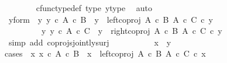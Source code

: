 \begin{isabellebody}
\ \ \ \ \ \ \isamarkupfalse%
\ cfunc{\isacharunderscore}{\kern0pt}type{\isacharunderscore}{\kern0pt}def\ {\isasymphi}{\isacharunderscore}{\kern0pt}type\ y{\isacharunderscore}{\kern0pt}type\ \isamarkupfalse%
\ auto\isanewline
\ \ \ \ \isamarkupfalse%
\ \isamarkupfalse%
\ y{\isacharunderscore}{\kern0pt}form{\isacharcolon}{\kern0pt}\ {\isachardoublequoteopen}{\isacharparenleft}{\kern0pt}{\isasymexists}\ y{\isacharprime}{\kern0pt}{\isachardot}{\kern0pt}\ y{\isacharprime}{\kern0pt}\ {\isasymin}\isactrlsub c\ A\ {\isasymtimes}\isactrlsub c\ B\ {\isasymand}\ y\ {\isacharequal}{\kern0pt}\ {\isacharparenleft}{\kern0pt}left{\isacharunderscore}{\kern0pt}coproj\ {\isacharparenleft}{\kern0pt}A\ {\isasymtimes}\isactrlsub c\ B{\isacharparenright}{\kern0pt}\ {\isacharparenleft}{\kern0pt}A\ {\isasymtimes}\isactrlsub c\ C{\isacharparenright}{\kern0pt}{\isacharparenright}{\kern0pt}\ {\isasymcirc}\isactrlsub c\ y{\isacharprime}{\kern0pt}{\isacharparenright}{\kern0pt}\isanewline
\ \ \ \ \ \ {\isasymor}\ \ {\isacharparenleft}{\kern0pt}{\isasymexists}\ y{\isacharprime}{\kern0pt}{\isachardot}{\kern0pt}\ y{\isacharprime}{\kern0pt}\ {\isasymin}\isactrlsub c\ A\ {\isasymtimes}\isactrlsub c\ C\ {\isasymand}\ y\ {\isacharequal}{\kern0pt}\ {\isacharparenleft}{\kern0pt}right{\isacharunderscore}{\kern0pt}coproj\ {\isacharparenleft}{\kern0pt}A\ {\isasymtimes}\isactrlsub c\ B{\isacharparenright}{\kern0pt}\ {\isacharparenleft}{\kern0pt}A\ {\isasymtimes}\isactrlsub c\ C{\isacharparenright}{\kern0pt}{\isacharparenright}{\kern0pt}\ {\isasymcirc}\isactrlsub c\ y{\isacharprime}{\kern0pt}{\isacharparenright}{\kern0pt}{\isachardoublequoteclose}\isanewline
\ \ \ \ \ \ \isamarkupfalse%
\ {\isacharparenleft}{\kern0pt}simp\ add{\isacharcolon}{\kern0pt}\ coprojs{\isacharunderscore}{\kern0pt}jointly{\isacharunderscore}{\kern0pt}surj{\isacharparenright}{\kern0pt}\isanewline
\ \ \ \ \isanewline
\ \ \ \ \isamarkupfalse%
\ {\isachardoublequoteopen}x\ {\isacharequal}{\kern0pt}\ y{\isachardoublequoteclose}\ \isanewline
\ \ \ \ \isamarkupfalse%
{\isacharparenleft}{\kern0pt}cases\ {\isachardoublequoteopen}{\isacharparenleft}{\kern0pt}{\isasymexists}\ x{\isacharprime}{\kern0pt}{\isachardot}{\kern0pt}\ x{\isacharprime}{\kern0pt}\ {\isasymin}\isactrlsub c\ A\ {\isasymtimes}\isactrlsub c\ B\ {\isasymand}\ x\ {\isacharequal}{\kern0pt}\ {\isacharparenleft}{\kern0pt}left{\isacharunderscore}{\kern0pt}coproj\ {\isacharparenleft}{\kern0pt}A\ {\isasymtimes}\isactrlsub c\ B{\isacharparenright}{\kern0pt}\ {\isacharparenleft}{\kern0pt}A\ {\isasymtimes}\isactrlsub c\ C{\isacharparenright}{\kern0pt}{\isacharparenright}{\kern0pt}\ {\isasymcirc}\isactrlsub c\ x{\isacharprime}{\kern0pt}{\isacharparenright}{\kern0pt}{\isachardoublequoteclose}{\isacharparenright}{\kern0pt}\isanewline

\end{isabellebody}
